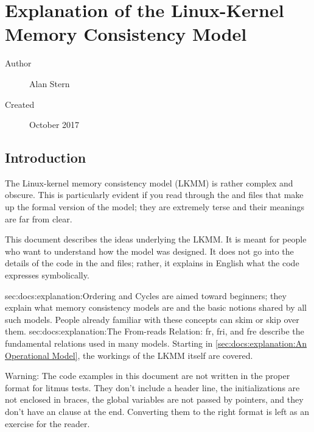 \section{Explanation of the Linux-Kernel Memory Consistency Model}

\begin{Note}
\begin{description}
\item[Author] Alan Stern 
\item[Created] October 2017
\end{description}
\end{Note}

\subsection{Introduction}

The Linux-kernel memory consistency model (LKMM) is rather complex and
obscure.
This is particularly evident if you read through the
 and  files that
make up the formal version of the model; they are extremely terse and
their meanings are far from clear.

This document describes the ideas underlying the LKMM\@.
It is meant for people who want to understand how the model was designed.
It does not go into the details of the code in the  and
 files; rather, it explains in English what the code
expresses symbolically.

%
  {sec:docs:explanation:Ordering and Cycles} are aimed
toward beginners; they explain what memory consistency models are and
the basic notions shared by all such models.
People already familiar with these concepts can skim or skip over them.
%
 {sec:docs:explanation:The From-reads Relation: fr, fri, and fre}
describe the fundamental relations used in many models.
Starting in \cref{sec:docs:explanation:An Operational Model},
the workings of the LKMM itself are covered.

\begin{Warn}
  Warning:
  The code examples in this document are not written in the proper format
  for litmus tests.
  They don't include a header line, the initializations are not enclosed
  in braces, the global variables are not passed by pointers, and they
  don't have an  clause at the end.
  Converting them to the right format is left as an exercise for the reader.
\end{Warn}

